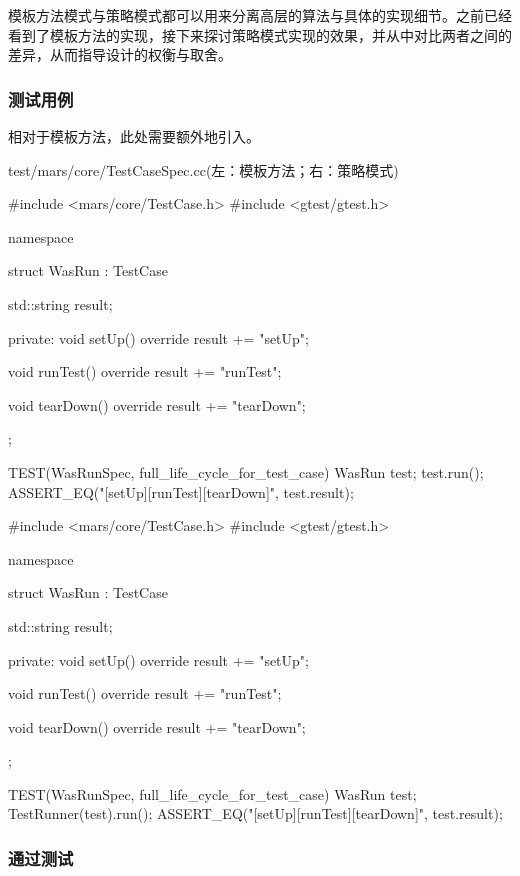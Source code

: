 \begin{content}

模板方法模式与策略模式都可以用来分离高层的算法与具体的实现细节。之前已经看到了模板方法的实现，接下来探讨策略模式实现的效果，并从中对比两者之间的差异，从而指导设计的权衡与取舍。

\subsubsection{测试用例}

相对于模板方法，此处需要额外地引入。

\begin{diff}{test/mars/core/TestCaseSpec.cc(左：模板方法；右：策略模式)}
 \begin{minicpp}
#include <mars/core/TestCase.h>
#include <gtest/gtest.h>

namespace {
  struct WasRun : TestCase {
    std::string result;

  private:
    void setUp() override {
      result += "setUp";
    }

    void runTest() override {
      result += "runTest";
    }

    void tearDown() override {
      result += "tearDown";
    }
  };
}

TEST(WasRunSpec, full_life_cycle_for_test_case) {
  WasRun test;
  test.run();
  ASSERT_EQ("[setUp][runTest][tearDown]", test.result);
} 
  \end{minicpp}
\tcblower
 \begin{minicpp}
#include <mars/core/TestCase.h>
#include <gtest/gtest.h>

namespace {
  struct WasRun : TestCase {
    std::string result;

  private:
    void setUp() override {
      result += "setUp";
    }

    void runTest() override {
      result += "runTest";
    }

    void tearDown() override {
      result += "tearDown";
    }
  };
}

TEST(WasRunSpec, full_life_cycle_for_test_case) {
  WasRun test;
  TestRunner(test).run();
  ASSERT_EQ("[setUp][runTest][tearDown]", test.result);
}
 \end{minicpp} 
\end{diff}

\subsubsection{通过测试}


\end{content}
